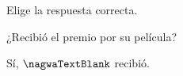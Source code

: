 
\begin{question}

\begin{instance}
  
\begin{mcq}[standalone=false]
    
\begin{stem}
      Elige la respuesta correcta.\par      
\begin{enumerationnolabel}
        \item{¿Recibió el premio por su película?}        
        \item{Sí, $ \nagwaTextBlank$ recibió.}      
\end{enumerationnolabel}
          
\end{stem}
    
\begin{distractors}
\end{distractors}
              
\end{mcq}

\end{instance}

\end{question}
